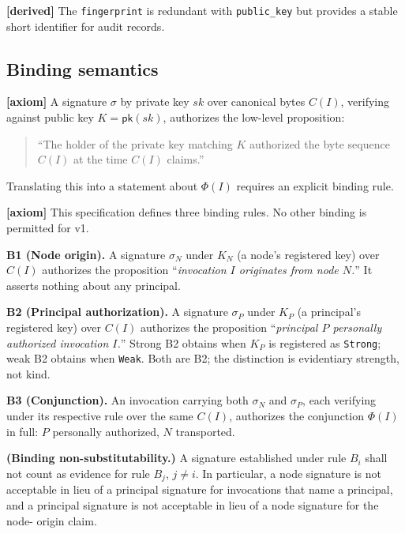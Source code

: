 \documentclass[11pt,a4paper]{article}
\newcommand{\axiom}{\textcolor{axiomcolor}{\textbf{[axiom]}}\xspace}
\newcommand{\derived}{\textcolor{derivedcolor}{\textbf{[derived]}}\xspace}
\begin{document}
\derived{} The \texttt{fingerprint} is redundant with
\texttt{public\_key} but provides a stable short identifier for audit
records.

\subsection{Binding semantics}
\label{sec:binding}

\axiom{} A signature $\sigma$ by private key $\mathit{sk}$ over
canonical bytes $C(I)$, verifying against public key
$K = \mathsf{pk}(\mathit{sk})$, authorizes the low-level proposition:

\begin{quote}
``The holder of the private key matching $K$ authorized the byte
sequence $C(I)$ at the time $C(I)$ claims.''
\end{quote}

Translating this into a statement about $\Phi(I)$ requires an explicit
binding rule.

\axiom{} This specification defines three binding rules. No other
binding is permitted for v1.

\begin{property}
\textbf{B1 (Node origin).}
A signature $\sigma_N$ under $K_N$ (a node's registered key) over
$C(I)$ authorizes the proposition ``\emph{invocation $I$ originates
from node $N$.}'' It asserts nothing about any principal.
\end{property}

\begin{property}
\textbf{B2 (Principal authorization).}
A signature $\sigma_P$ under $K_P$ (a principal's registered key) over
$C(I)$ authorizes the proposition ``\emph{principal $P$ personally
authorized invocation $I$.}'' Strong B2 obtains when $K_P$ is
registered as \texttt{Strong}; weak B2 obtains when \texttt{Weak}.
Both are B2; the distinction is evidentiary strength, not kind.
\end{property}

\begin{property}
\textbf{B3 (Conjunction).}
An invocation carrying both $\sigma_N$ and $\sigma_P$, each verifying
under its respective rule over the same $C(I)$, authorizes the
conjunction $\Phi(I)$ in full: $P$ personally authorized, $N$
transported.
\end{property}

\begin{invariant}
\textbf{(Binding non-substitutability.)} A signature established under
rule $B_i$ shall not count as evidence for rule $B_j$, $j \ne i$. In
particular, a node signature is not acceptable in lieu of a principal
signature for invocations that name a principal, and a principal
signature is not acceptable in lieu of a node signature for the node-
origin claim.
\end{invariant}
\end{document}
